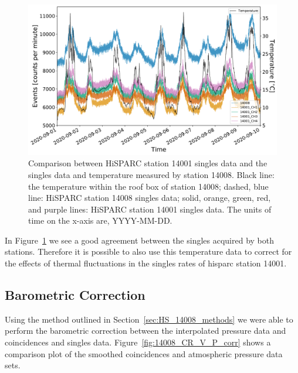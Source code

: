 \begin{figure}[ht!]
	\centering
	\includegraphics[width=0.8\columnwidth]{HS_14008_vs_14001_and_temp.pdf}
	\caption{Comparison between HiSPARC station 14001 singles data and the singles data and temperature measured by station 14008. Black line: the temperature within the roof box of station 14008; dashed, blue line: HiSPARC station 14008 singles data; solid, orange, green, red, and purple lines: HiSPARC station 14001 singles data. The units of time on the x-axis are, YYYY-MM-DD.}
	\label{fig:HS_14008_14001_vs_T}
\end{figure}

In Figure~\ref{fig:HS_14008_14001_vs_T} we see a good agreement between the singles acquired by both stations. Therefore it is possible to also use this temperature data to correct for the effects of thermal fluctuations in the singles rates of \gls{hisparc} station 14001.



\subsection{Barometric Correction}\label{sec:HS_14008_P_corr}


Using the method outlined in Section~\ref{sec:HS_14008_methods} we were able to perform the barometric correction between the interpolated pressure data and coincidences and singles data. Figure~\ref{fig:14008_CR_V_P_corr} shows a comparison plot of the smoothed coincidences and atmospheric pressure data sets.


